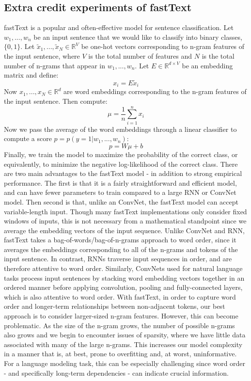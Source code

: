\documentclass[a4paper]{article}
\begin{document}
\subsection{Extra credit experiments of fastText}
fastText is a popular and often-effective model for sentence classification. Let $w_1,...,w_n$ be an input sentence that we would like to classify into binary classes, $\{0,1\}$. Let $\tilde{x}_1,...,\tilde{x}_N \in \mathbb{R}^V$ be one-hot vectors corresponding to n-gram features of the input sentence, where $V$ is the total number of features and $N$ is the total number of n-grams that appear in $w_1,...,w_n$. Let $E \in \mathbb{R}^{d \times V}$ be an embedding matrix and define:
$$x_i = E \tilde{x}_i $$
Now $x_1,...,x_N \in \mathbb{R}^{d}$ are word embeddings corresponding to the n-gram features of the input sentence. Then compute:
$$\mu = \frac{1}{n} \sum_{i=1}^n x_i $$
Now we pass the average of the word embeddings through a linear classifier to compute a score $p = p(y=1 | w_1,...,w_n)$:
$$ p = W \mu + b $$
Finally, we train the model to maximize the probability of the correct class, or equivalently, to minimize the negative log-likelihood of the correct class. 
\newline
\newline
There are two main advantages to the fastText model - in addition to strong empirical performance. The first is that it is a fairly straightforward and efficient model, and can have fewer parameters to train compared to a large RNN or ConvNet model. Then second is that, unlike an ConvNet, the fastText model can accept variable-length input. Though many fastText implementations only consider fixed windows of inputs, this is not necessary from a mathematical standpoint since we average the embedding vectors of the input sequence.
\newline
\newline
Unlike ConvNet and RNN, fastText takes a bag-of-words/bag-of-n-grams approach to word order, since it averages the embeddings corresponding to all of the n-grams and tokens of the input sentence. In contrast, RNNs traverse input sequences in order, and are therefore attentive to word order. Similarly, ConvNets used for natural language tasks process input sentences by stacking word embedding vectors together in an ordered manner before applying convolution, pooling and fully-connected layers, which is also attentive to word order. With fastText, in order to capture word order and longer-term relationships between non-adjacent tokens, our best approach is to consider larger-sized n-gram features. However, this can become problematic. As the size of the n-gram grows, the number of possible n-grams also grows and we begin to encounter issues of sparsity, where we have little data associated with many of the large n-grams. This increases our model complexity in a manner that is, at best, prone to overfitting and, at worst, uninformative. For a language modeling task, this can be especially challenging since word order - and specifically long-term dependencies - can indicate crucial information. 
\end{document}
